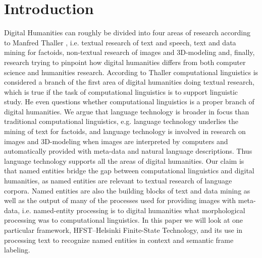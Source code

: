 \documentclass{llncs}
\begin{document}
\section*{Introduction}
Digital Humanities can roughly be divided into four areas of research
according to Manfred Thaller \cite{Thaller2012}, i.e. textual research
of text and speech, text and data mining for factoids, non-textual
research of images and 3D-modeling and, finally, research trying to
pinpoint how digital humanities differs from both computer science and
humanities research. According to Thaller computational linguistics is
considered a branch of the first area of digital humanities doing
textual research, which is true if the task of computational
linguistics is to support linguistic study. He even questions whether
computational linguistics is a proper branch of digital humanities. We
argue that language technology is broader in focus than traditional
computational linguistics, e.g. language technology underlies the
mining of text for factoids, and language technology is involved in
research on images and 3D-modeling when images are interpreted by
computers and automatically provided with meta-data and natural
language descriptions. Thus language technology supports all the areas
of digital humanities. Our claim is that named entities bridge the gap
between computational linguistics and digital humanities, 
as named entities are relevant to textual research of language corpora. 
Named entities are also the building blocks of text and data mining 
as well as the output of many of the processes used for providing images 
with meta-data, i.e. named-entity processing is to digital humanities what
morphological processing was to computational linguistics. In this
paper we will look at one particular framework, HFST--Helsinki
Finite-State Technology, and its use in processing text to recognize
named entities in context and semantic frame labeling.
\end{document}
